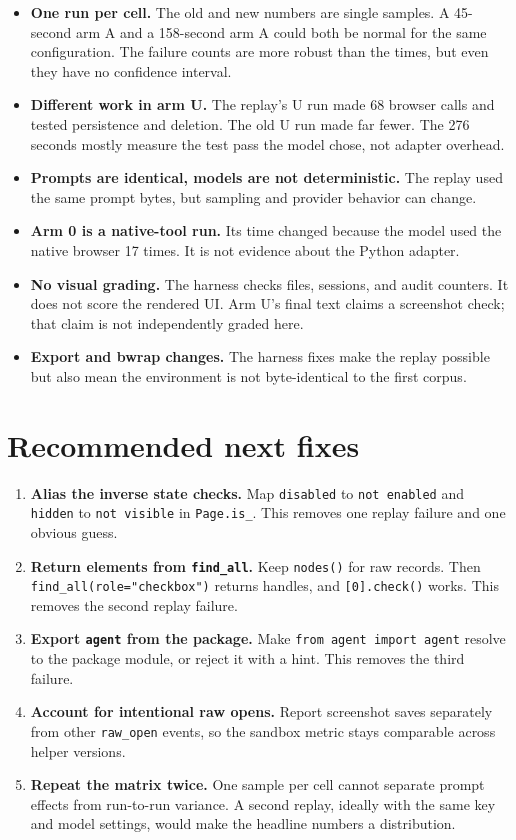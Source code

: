 \documentclass[11pt]{article}
\newcommand{\code}[1]{\texttt{#1}}
\begin{document}
\begin{itemize}[leftmargin=1.3em]
\item \textbf{One run per cell.} The old and new numbers are single samples.
A 45-second arm A and a 158-second arm A could both be normal for the same
configuration. The failure counts are more robust than the times, but even they
have no confidence interval.
\item \textbf{Different work in arm U.} The replay's U run made 68 browser calls
and tested persistence and deletion. The old U run made far fewer. The 276
seconds mostly measure the test pass the model chose, not adapter overhead.
\item \textbf{Prompts are identical, models are not deterministic.} The replay
used the same prompt bytes, but sampling and provider behavior can change.
\item \textbf{Arm 0 is a native-tool run.} Its time changed because the model
used the native browser 17 times. It is not evidence about the Python adapter.
\item \textbf{No visual grading.} The harness checks files, sessions, and audit
counters. It does not score the rendered UI. Arm U's final text claims a
screenshot check; that claim is not independently graded here.
\item \textbf{Export and bwrap changes.} The harness fixes make the replay
possible but also mean the environment is not byte-identical to the first
corpus.
\end{itemize}

\section{Recommended next fixes}
\label{sec:next}

\begin{enumerate}[leftmargin=1.5em]
\small
\item \textbf{Alias the inverse state checks.} Map \code{disabled} to
\code{not enabled} and \code{hidden} to \code{not visible} in
\code{Page.is\_}. This removes one replay failure and one obvious guess.
\item \textbf{Return elements from \code{find\_all}.} Keep \code{nodes()} for
raw records. Then \code{find\_all(role="checkbox")} returns handles, and
\code{[0].check()} works. This removes the second replay failure.
\item \textbf{Export \code{agent} from the package.} Make
\code{from agent import agent} resolve to the package module, or reject it with
a hint. This removes the third failure.
\item \textbf{Account for intentional raw opens.} Report screenshot saves
separately from other \code{raw\_open} events, so the sandbox metric stays
comparable across helper versions.
\item \textbf{Repeat the matrix twice.} One sample per cell cannot separate
prompt effects from run-to-run variance. A second replay, ideally with the same
key and model settings, would make the headline numbers a distribution.
\end{enumerate}
\end{document}
